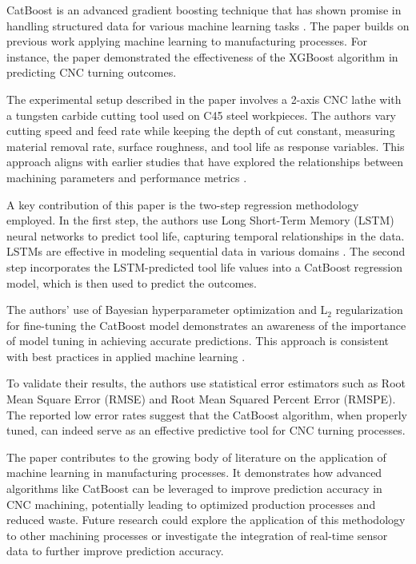 \documentclass{book}
\numberwithin{equation}{section}
\numberwithin{figure}{section}
\begin{document}
CatBoost is an advanced gradient boosting technique that has shown promise in handling structured data for various machine learning tasks \citep{prokhorenkova2018catboost}. The paper builds on previous work applying machine learning to manufacturing processes. For instance, the paper \citep{chakraborty2021application} demonstrated the effectiveness of the XGBoost algorithm in predicting CNC turning outcomes.

The experimental setup described in the paper involves a 2-axis CNC lathe with a tungsten carbide cutting tool used on C45 steel workpieces. The authors vary cutting speed and feed rate while keeping the depth of cut constant, measuring material removal rate, surface roughness, and tool life as response variables. This approach aligns with earlier studies that have explored the relationships between machining parameters and performance metrics \citep{lee1996adaptive}.

A key contribution of this paper is the two-step regression methodology employed. In the first step, the authors use Long Short-Term Memory (LSTM) neural networks to predict tool life, capturing temporal relationships in the data. LSTMs are effective in modeling sequential data in various domains \citep{hochreiter1997long}. The second step incorporates the LSTM-predicted tool life values into a CatBoost regression model, which is then used to predict the outcomes.

The authors' use of Bayesian hyperparameter optimization and L$_2$ regularization for fine-tuning the CatBoost model demonstrates an awareness of the importance of model tuning in achieving accurate predictions. This approach is consistent with best practices in applied machine learning \citep{snoek2012practical}.

To validate their results, the authors use statistical error estimators such as Root Mean Square Error (RMSE) and Root Mean Squared Percent Error (RMSPE). The reported low error rates suggest that the CatBoost algorithm, when properly tuned, can indeed serve as an effective predictive tool for CNC turning processes.

The paper contributes to the growing body of literature on the application of machine learning in manufacturing processes. It demonstrates how advanced algorithms like CatBoost can be leveraged to improve prediction accuracy in CNC machining, potentially leading to optimized production processes and reduced waste. Future research could explore the application of this methodology to other machining processes or investigate the integration of real-time sensor data to further improve prediction accuracy.
\end{document}
